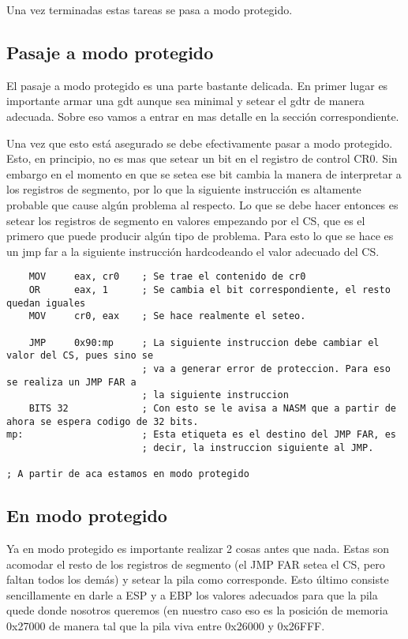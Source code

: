 	Una vez terminadas estas tareas se pasa a modo protegido.

\subsection{Pasaje a modo protegido}

	El pasaje a modo protegido es una parte bastante delicada.
En primer lugar es importante armar una gdt aunque sea minimal y setear
el gdtr de manera adecuada. Sobre eso vamos a entrar en mas detalle
en la sección correspondiente.

	Una vez que esto está asegurado se debe efectivamente pasar
a modo protegido. Esto, en principio, no es mas que setear un bit en el
registro de control CR0. Sin embargo en el momento en que se setea
ese bit cambia la manera de interpretar a los registros de segmento, por lo que
la siguiente instrucción es altamente probable que cause algún problema al
respecto. Lo que se debe hacer entonces es setear los registros de segmento
en valores empezando por el CS, que es el primero que puede producir algún tipo de problema.
Para esto lo que se hace es un jmp far a la siguiente instrucción
hardcodeando el valor adecuado del CS. 

\begin{verbatim}
	MOV		eax, cr0	; Se trae el contenido de cr0
	OR		eax, 1		; Se cambia el bit correspondiente, el resto quedan iguales
	MOV		cr0, eax	; Se hace realmente el seteo.
	
	JMP		0x90:mp		; La siguiente instruccion debe cambiar el valor del CS, pues sino se
						; va a generar error de proteccion. Para eso se realiza un JMP FAR a 
						; la siguiente instruccion
	BITS 32				; Con esto se le avisa a NASM que a partir de ahora se espera codigo de 32 bits.
mp:						; Esta etiqueta es el destino del JMP FAR, es 
						; decir, la instruccion siguiente al JMP.

; A partir de aca estamos en modo protegido
\end{verbatim}

\subsection{En modo protegido}

	Ya en modo protegido es importante realizar 2 cosas
antes que nada. Estas son acomodar el resto de los registros
de segmento (el JMP FAR setea el CS, pero faltan todos los demás)
y setear la pila como corresponde. Esto  último consiste sencillamente
en darle a ESP y a EBP los valores adecuados para que la pila quede
donde nosotros queremos (en nuestro caso eso es la posición de memoria 0x27000
de manera tal que la pila viva entre 0x26000 y 0x26FFF.

